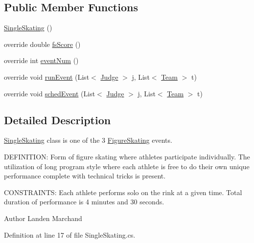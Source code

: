 \subsection*{Public Member Functions}
\begin{DoxyCompactItemize}
\item 
\hyperlink{classPCO_1_1SingleSkating_ae7c9d29f9cde56cd158564c20854f482}{Single\+Skating} ()
\item 
override double \hyperlink{classPCO_1_1SingleSkating_a36f8a341cc9e3259d898eb4ff15a98ec}{fs\+Score} ()
\item 
override int \hyperlink{classPCO_1_1SingleSkating_ab7ac6446917e2d9fa363291ec473567d}{event\+Num} ()
\item 
override void \hyperlink{classPCO_1_1SingleSkating_aae06189e3102d74a26b7af29338a168a}{run\+Event} (List$<$ \hyperlink{classPCO_1_1Judge}{Judge} $>$ j, List$<$ \hyperlink{classPCO_1_1Team}{Team} $>$ t)
\item 
override void \hyperlink{classPCO_1_1SingleSkating_ae97935dfac37a5818431c5b9de138345}{sched\+Event} (List$<$ \hyperlink{classPCO_1_1Judge}{Judge} $>$ j, List$<$ \hyperlink{classPCO_1_1Team}{Team} $>$ t)
\end{DoxyCompactItemize}


\subsection{Detailed Description}
\hyperlink{classPCO_1_1SingleSkating}{Single\+Skating} class is one of the 3 \hyperlink{classPCO_1_1FigureSkating}{Figure\+Skating} events. 

D\+E\+F\+I\+N\+I\+T\+I\+O\+N\+: Form of figure skating where athletes participate individually. The utilization of long program style where each athlete is free to do their own unique performance complete with technical tricks is present.

C\+O\+N\+S\+T\+R\+A\+I\+N\+T\+S\+: Each athlete performs solo on the rink at a given time. Total duration of performance is 4 minutes and 30 seconds.\begin{DoxyAuthor}{Author}
Landen Marchand 
\end{DoxyAuthor}


Definition at line 17 of file Single\+Skating.\+cs.



